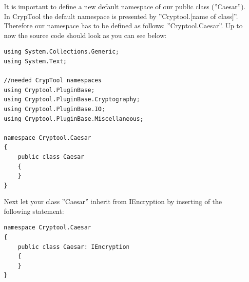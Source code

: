 It is important to define a new default namespace of our public class (''Caesar''). In CrypTool the default namespace is presented by ''Cryptool.[name of class]''. Therefore our namespace has to be defined as follows: ''Cryptool.Caesar''.\clearpage
Up to now the source code should look as you can see below:
\begin{lstlisting}
using System.Collections.Generic;
using System.Text;

//needed CrypTool namespaces
using Cryptool.PluginBase;
using Cryptool.PluginBase.Cryptography;
using Cryptool.PluginBase.IO;
using Cryptool.PluginBase.Miscellaneous;

namespace Cryptool.Caesar
{
	public class Caesar
	{
	}
}
\end{lstlisting}
Next let your class ''Caesar'' inherit from IEncryption by inserting of the following statement:
\begin{lstlisting}
namespace Cryptool.Caesar
{
	public class Caesar: IEncryption
	{
	}
}
\end{lstlisting}
